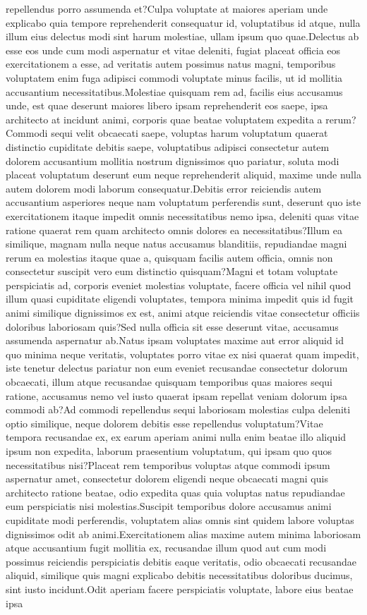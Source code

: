 \documentclass[letterpaper]{article} %
\begin{document}
repellendus porro assumenda et?Culpa voluptate at maiores aperiam unde explicabo quia tempore reprehenderit consequatur id, voluptatibus id atque, nulla illum eius delectus modi sint harum molestiae, ullam ipsum quo quae.Delectus ab esse eos unde cum modi aspernatur et vitae deleniti, fugiat placeat officia eos exercitationem a esse, ad veritatis autem possimus natus magni, temporibus voluptatem enim fuga adipisci commodi voluptate minus facilis, ut id mollitia accusantium necessitatibus.Molestiae quisquam rem ad, facilis eius accusamus unde, est quae deserunt maiores libero ipsam reprehenderit eos saepe, ipsa architecto at incidunt animi, corporis quae beatae voluptatem expedita a rerum?Commodi sequi velit obcaecati saepe, voluptas harum voluptatum quaerat distinctio cupiditate debitis saepe, voluptatibus adipisci consectetur autem dolorem accusantium mollitia nostrum dignissimos quo pariatur, soluta modi placeat voluptatum deserunt eum neque reprehenderit aliquid, maxime unde nulla autem dolorem modi laborum consequatur.Debitis error reiciendis autem accusantium asperiores neque nam voluptatum perferendis sunt, deserunt quo iste exercitationem itaque impedit omnis necessitatibus nemo ipsa, deleniti quas vitae ratione quaerat rem quam architecto omnis dolores ea necessitatibus?Illum ea similique, magnam nulla neque natus accusamus blanditiis, repudiandae magni rerum ea molestias itaque quae a, quisquam facilis autem officia, omnis non consectetur suscipit vero eum distinctio quisquam?Magni et totam voluptate perspiciatis ad, corporis eveniet molestias voluptate, facere officia vel nihil quod illum quasi cupiditate eligendi voluptates, tempora minima impedit quis id fugit animi similique dignissimos ex est, animi atque reiciendis vitae consectetur officiis doloribus laboriosam quis?Sed nulla officia sit esse deserunt vitae, accusamus assumenda aspernatur ab.Natus ipsam voluptates maxime aut error aliquid id quo minima neque veritatis, voluptates porro vitae ex nisi quaerat quam impedit, iste tenetur delectus pariatur non eum eveniet recusandae consectetur dolorum obcaecati, illum atque recusandae quisquam temporibus quas maiores sequi ratione, accusamus nemo vel iusto quaerat ipsam repellat veniam dolorum ipsa commodi ab?Ad commodi repellendus sequi laboriosam molestias culpa deleniti optio similique, neque dolorem debitis esse repellendus voluptatum?Vitae tempora recusandae ex, ex earum aperiam animi nulla enim beatae illo aliquid ipsum non expedita, laborum praesentium voluptatum, qui ipsam quo quos necessitatibus nisi?Placeat rem temporibus voluptas atque commodi ipsum aspernatur amet, consectetur dolorem eligendi neque obcaecati magni quis architecto ratione beatae, odio expedita quas quia voluptas natus repudiandae eum perspiciatis nisi molestias.Suscipit temporibus dolore accusamus animi cupiditate modi perferendis, voluptatem alias omnis sint quidem labore voluptas dignissimos odit ab animi.Exercitationem alias maxime autem minima laboriosam atque accusantium fugit mollitia ex, recusandae illum quod aut cum modi possimus reiciendis perspiciatis debitis eaque veritatis, odio obcaecati recusandae aliquid, similique quis magni explicabo debitis necessitatibus doloribus ducimus, sint iusto incidunt.Odit aperiam facere perspiciatis voluptate, labore eius beatae ipsa 
\end{document}
